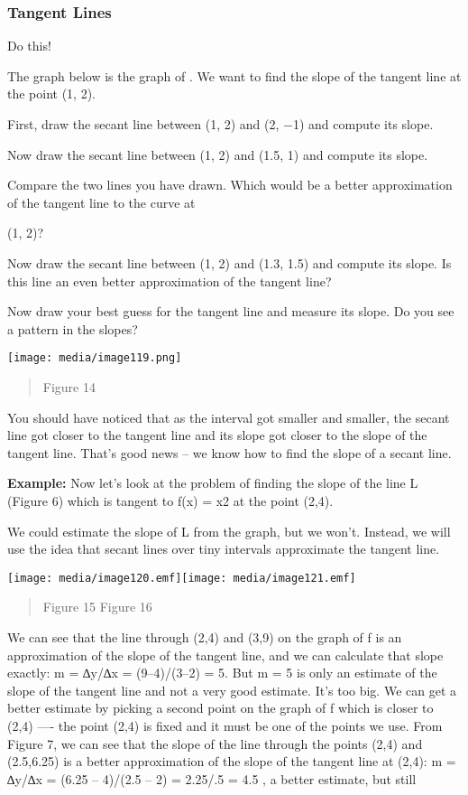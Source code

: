 \subsubsection{Tangent Lines}\label{tangent-lines}

Do this!

The graph below is the graph of . We want to find the slope of the
tangent line at the point (1, 2).

First, draw the secant line between (1, 2) and (2, −1) and compute its
slope.

Now draw the secant line between (1, 2) and (1.5, 1) and compute its
slope.

Compare the two lines you have drawn. Which would be a better
approximation of the tangent line to the curve at

(1, 2)?

Now draw the secant line between (1, 2) and (1.3, 1.5) and compute its
slope. Is this line an even better approximation of the tangent line?

Now draw your best guess for the tangent line and measure its slope. Do
you see a pattern in the slopes?

\texttt{[image: media/image119.png]}

\begin{quote}
Figure 14
\end{quote}

You should have noticed that as the interval got smaller and smaller,
the secant line got closer to the tangent line and its slope got closer
to the slope of the tangent line. That's good news -- we know how to
find the slope of a secant line.

\textbf{Example:} Now let's look at the problem of finding the slope of
the line L (Figure 6) which is tangent to f(x) = x2 at the point (2,4).

We could estimate the slope of L from the graph, but we won't. Instead,
we will use the idea that secant lines over tiny intervals approximate
the tangent line.

\texttt{[image: media/image120.emf]}\texttt{[image: media/image121.emf]}

\begin{quote}
Figure 15 Figure 16
\end{quote}

We can see that the line through (2,4) and (3,9) on the graph of f is an
approximation of the slope of the tangent line, and we can calculate
that slope exactly: m = ∆y/∆x = (9--4)/(3--2) = 5. But m = 5 is only an
estimate of the slope of the tangent line and not a very good estimate.
It's too big. We can get a better estimate by picking a second point on
the graph of f which is closer to (2,4) ---- the point (2,4) is fixed
and it must be one of the points we use. From Figure 7, we can see that
the slope of the line through the points (2,4) and (2.5,6.25) is a
better approximation of the slope of the tangent line at (2,4): m =
∆y/∆x = (6.25 -- 4)/(2.5 -- 2) = 2.25/.5 = 4.5 , a better estimate, but
still

